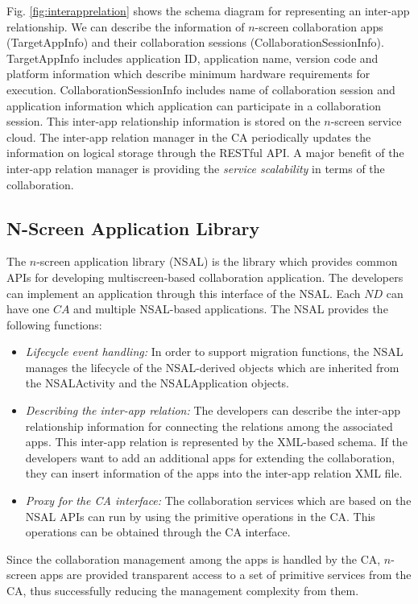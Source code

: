 \documentclass[conference]{IEEEtran}
\newcommand{\bi}{\begin{itemize}}
\newcommand{\ei}{\end{itemize}}
\newcommand{\ii}{\item}
\begin{document}
Fig. \ref{fig:interapprelation} shows the schema diagram for representing an inter-app relationship. We can describe the information of $n$-screen collaboration apps ({\small \sffamily TargetAppInfo}) and their collaboration sessions ({\small \sffamily CollaborationSessionInfo}). {\small \sffamily TargetAppInfo} includes application ID, application name, version code and platform information which describe minimum hardware requirements for execution.
{\small \sffamily CollaborationSessionInfo} includes name of collaboration session and application information which application can participate in a collaboration session. 
This inter-app relationship information is stored on the $n$-screen service cloud. The inter-app relation manager in the CA periodically updates the information on logical storage through the RESTful API.
A major benefit of the inter-app relation manager is providing the \textit{service scalability} in terms of the collaboration.

\subsection{N-Screen Application Library}
The $n$-screen application library (NSAL) is the library which provides common APIs for developing multiscreen-based collaboration application. The developers can implement an application through this interface of the NSAL. Each $ND$ can have one $CA$ and multiple NSAL-based applications. The NSAL provides the following functions:
\bi
\ii \textit{Lifecycle event handling: } In order to support migration functions, the NSAL manages the lifecycle of the NSAL-derived objects which are inherited from the {\small \sffamily NSALActivity} and the {\small \sffamily NSALApplication} objects. 
\ii \textit{Describing the inter-app relation:} The developers can describe the inter-app relationship information for connecting the relations among the associated apps. This inter-app relation is represented by the XML-based schema. If the developers want to add an additional apps for extending the collaboration, they can insert information of the apps into the inter-app relation XML file.
\ii \textit{Proxy for the CA interface: } The collaboration services which are based on the NSAL APIs can run by using the primitive operations in the CA. This operations can be obtained through the CA interface. 
\ei 
Since the collaboration management among the apps is handled by the CA, 
$n$-screen apps are provided transparent access to a set of primitive services from the CA, thus successfully reducing the management complexity from them.
\end{document}
